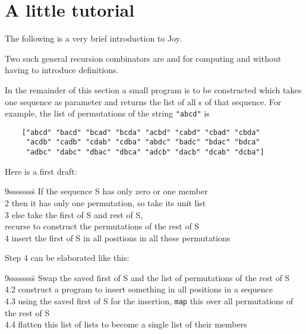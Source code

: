 \section{A little tutorial}
\par
The following is a very brief introduction to Joy.

\par
Two such general recursion combinators are 
and  for computing
 and 
without having to introduce definitions.
\par
In the remainder of this section
a small program is to be constructed
which takes one sequence as parameter
and returns the list of all s of that sequence.
For example, the list of permutations of the string \verb#"abcd"# is
\begin{verbatim}
    ["abcd" "bacd" "bcad" "bcda" "acbd" "cabd" "cbad" "cbda"
     "acdb" "cadb" "cdab" "cdba" "abdc" "badc" "bdac" "bdca"
     "adbc" "dabc" "dbac" "dbca" "adcb" "dacb" "dcab" "dcba"]
\end{verbatim}
Here is a first draft:
\begin{tabbing}
9ssssssss\=           \> If \= the sequence S has only zero or one member \\
2        \>    \> then it has only one permutation, so take its unit list \\
3        \>    \> else \= take the first of S and rest of S, \\
         \>    \>      \> recurse to construct
                              the permutations of the rest of S \\
4        \>    \>      \> insert the first of S in all positions
                              in all these permutations \\
\end{tabbing}
Step 4 can be elaborated like this:
\begin{tabbing}
9ssssssss\=         \> Swap the saved first of S and the
              list of permutations of the rest of S \\
4.2      \> construct a program to insert something
              in all positions in a sequence \\
4.3      \> using the saved first of S for the insertion,
              \verb#map# this over all permutations of the rest of S \\
4.4      \> flatten this list of lists to become
              a single list of their members \\
\end{tabbing}
